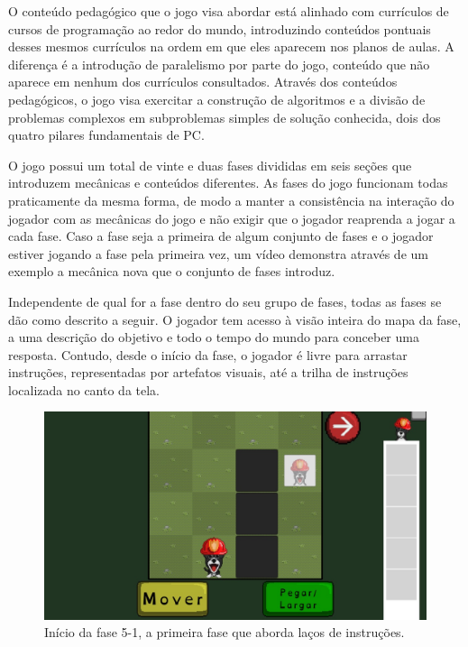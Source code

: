 \documentclass[conference]{IEEEtran}
\begin{document}
O conteúdo pedagógico que o jogo visa abordar está alinhado com currículos de cursos de programação ao redor do mundo\cite{b8}\cite{b23}, introduzindo conteúdos pontuais desses mesmos currículos na ordem em que eles aparecem nos planos de aulas. A diferença é a introdução de paralelismo por parte do jogo, conteúdo que não aparece em nenhum dos currículos consultados. Através dos conteúdos pedagógicos, o jogo visa exercitar a construção de algoritmos e a divisão de problemas complexos em subproblemas simples de solução conhecida, dois dos quatro pilares fundamentais de PC\cite{b6}.

O jogo possui um total de vinte e duas fases divididas em seis seções que introduzem mecânicas e conteúdos diferentes. As fases do jogo funcionam todas praticamente da mesma forma, de modo a manter a consistência na interação do jogador com as mecânicas do jogo e não exigir que o jogador reaprenda a jogar a cada fase. Caso a fase seja a primeira de algum conjunto de fases e o jogador estiver jogando a fase pela primeira vez, um vídeo demonstra através de um exemplo a mecânica nova que o conjunto de fases introduz.

Independente de qual for a fase dentro do seu grupo de fases, todas as fases se dão como descrito a seguir. O jogador tem acesso à visão inteira do mapa da fase, a uma descrição do objetivo e todo o tempo do mundo para conceber uma resposta. Contudo, desde o início da fase, o jogador é livre para arrastar instruções, representadas por artefatos visuais, até a trilha de instruções localizada no canto da tela.

\begin{figure}[htbp]
\centerline{\includegraphics[scale=0.275]{images/fig01.jpg}}
\caption{Início da fase 5-1, a primeira fase que aborda laços de instruções.}
\label{fig}
\end{figure}
\end{document}
